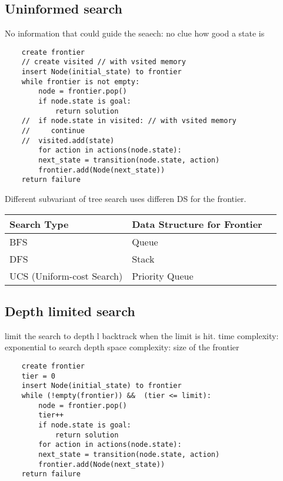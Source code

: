 \documentclass{article}
\begin{document}
\subsection*{Uninformed search} 
No information that could guide the seaech: no clue how good a state is
\begin{lstlisting}
    create frontier 
    // create visited // with vsited memory
    insert Node(initial_state) to frontier 
    while frontier is not empty: 
        node = frontier.pop() 
        if node.state is goal: 
            return solution 
    //  if node.state in visited: // with vsited memory
    //     continue 
    //  visited.add(state)
        for action in actions(node.state): 
        next_state = transition(node.state, action) 
        frontier.add(Node(next_state)) 
    return failure
\end{lstlisting}
Different subvariant of tree search uses differen DS for the frontier.\newline
\begin{tabular}{|l|l|l|}
    \hline
    \textbf{Search Type} & \textbf{Data Structure for Frontier}\\
    \hline
    BFS & Queue \\
    \hline
    DFS & Stack \\
    \hline
    UCS (Uniform-cost Search) & Priority Queue \\
    \hline
\end{tabular}

    
\subsection*{Depth limited search} 
limit the search to depth l \newline
backtrack when the limit is hit. \newline
time complexity: exponential to search depth \newline
space complexity: size of the frontier \newline
\begin{lstlisting}
    create frontier 
    tier = 0
    insert Node(initial_state) to frontier 
    while (!empty(frontier)) &&  (tier <= limit):
        node = frontier.pop() 
        tier++
        if node.state is goal: 
            return solution 
        for action in actions(node.state): 
        next_state = transition(node.state, action) 
        frontier.add(Node(next_state)) 
    return failure
\end{lstlisting}
\end{document}
